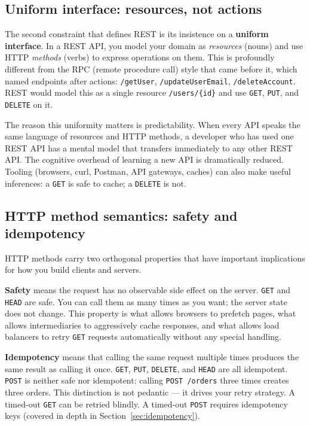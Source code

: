 \documentclass[11pt,a4paper]{article}
\begin{document}
\subsection{Uniform interface: resources, not actions}

The second constraint that defines REST is its insistence on a \textbf{uniform interface}. In a REST API, you model your domain as \emph{resources} (nouns) and use HTTP \emph{methods} (verbs) to express operations on them. This is profoundly different from the RPC (remote procedure call) style that came before it, which named endpoints after actions: \texttt{/getUser}, \texttt{/updateUserEmail}, \texttt{/deleteAccount}. REST would model this as a single resource \texttt{/users/\{id\}} and use \texttt{GET}, \texttt{PUT}, and \texttt{DELETE} on it.

The reason this uniformity matters is predictability. When every API speaks the same language of resources and HTTP methods, a developer who has used one REST API has a mental model that transfers immediately to any other REST API. The cognitive overhead of learning a new API is dramatically reduced. Tooling (browsers, curl, Postman, API gateways, caches) can also make useful inferences: a \texttt{GET} is safe to cache; a \texttt{DELETE} is not.

\subsection{HTTP method semantics: safety and idempotency}

HTTP methods carry two orthogonal properties that have important implications for how you build clients and servers.

\textbf{Safety} means the request has no observable side effect on the server. \texttt{GET} and \texttt{HEAD} are safe. You can call them as many times as you want; the server state does not change. This property is what allows browsers to prefetch pages, what allows intermediaries to aggressively cache responses, and what allows load balancers to retry \texttt{GET} requests automatically without any special handling.

\textbf{Idempotency} means that calling the same request multiple times produces the same result as calling it once. \texttt{GET}, \texttt{PUT}, \texttt{DELETE}, and \texttt{HEAD} are all idempotent. \texttt{POST} is neither safe nor idempotent: calling \texttt{POST /orders} three times creates three orders. This distinction is not pedantic --- it drives your retry strategy. A timed-out \texttt{GET} can be retried blindly. A timed-out \texttt{POST} requires idempotency keys (covered in depth in Section~\ref{sec:idempotency}).
\end{document}
